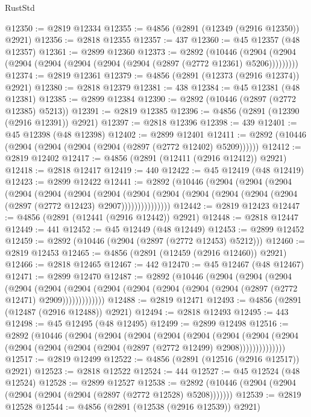 \begin{lexlean}{RustStd}
\begin{coremodule}
@12350 := @2819 @12334
@12355 := @4856 (@2891 (@12349 (@2916 @12350)) @2921)
@12356 := @2818 @12355
@12357 := 437
@12360 := @45 @12357 (@48 @12357)
@12361 := @2899 @12360
@12373 := @2892
    (@10446 (@2904 (@2904 (@2904 (@2904 (@2904 (@2904 (@2904 (@2897 (@2772 @12361) @5206)))))))))
@12374 := @2819 @12361
@12379 := @4856 (@2891 (@12373 (@2916 @12374)) @2921)
@12380 := @2818 @12379
@12381 := 438
@12384 := @45 @12381 (@48 @12381)
@12385 := @2899 @12384
@12390 := @2892 (@10446 (@2897 (@2772 @12385) @5213))
@12391 := @2819 @12385
@12396 := @4856 (@2891 (@12390 (@2916 @12391)) @2921)
@12397 := @2818 @12396
@12398 := 439
@12401 := @45 @12398 (@48 @12398)
@12402 := @2899 @12401
@12411 := @2892 (@10446 (@2904 (@2904 (@2904 (@2904 (@2897 (@2772 @12402) @5209))))))
@12412 := @2819 @12402
@12417 := @4856 (@2891 (@12411 (@2916 @12412)) @2921)
@12418 := @2818 @12417
@12419 := 440
@12422 := @45 @12419 (@48 @12419)
@12423 := @2899 @12422
@12441 := @2892
    (@10446
      (@2904
        (@2904
          (@2904
            (@2904
              (@2904
                (@2904
                  (@2904
                    (@2904
                      (@2904 (@2904 (@2904 (@2904 (@2904 (@2897 (@2772 @12423) @2907)))))))))))))))
@12442 := @2819 @12423
@12447 := @4856 (@2891 (@12441 (@2916 @12442)) @2921)
@12448 := @2818 @12447
@12449 := 441
@12452 := @45 @12449 (@48 @12449)
@12453 := @2899 @12452
@12459 := @2892 (@10446 (@2904 (@2897 (@2772 @12453) @5212)))
@12460 := @2819 @12453
@12465 := @4856 (@2891 (@12459 (@2916 @12460)) @2921)
@12466 := @2818 @12465
@12467 := 442
@12470 := @45 @12467 (@48 @12467)
@12471 := @2899 @12470
@12487 := @2892
    (@10446
      (@2904
        (@2904
          (@2904
            (@2904
              (@2904
                (@2904 (@2904 (@2904 (@2904 (@2904 (@2904 (@2897 (@2772 @12471) @2909)))))))))))))
@12488 := @2819 @12471
@12493 := @4856 (@2891 (@12487 (@2916 @12488)) @2921)
@12494 := @2818 @12493
@12495 := 443
@12498 := @45 @12495 (@48 @12495)
@12499 := @2899 @12498
@12516 := @2892
    (@10446
      (@2904
        (@2904
          (@2904
            (@2904
              (@2904
                (@2904
                  (@2904
                    (@2904 (@2904 (@2904 (@2904 (@2904 (@2897 (@2772 @12499) @2908))))))))))))))
@12517 := @2819 @12499
@12522 := @4856 (@2891 (@12516 (@2916 @12517)) @2921)
@12523 := @2818 @12522
@12524 := 444
@12527 := @45 @12524 (@48 @12524)
@12528 := @2899 @12527
@12538 := @2892 (@10446 (@2904 (@2904 (@2904 (@2904 (@2904 (@2897 (@2772 @12528) @5208)))))))
@12539 := @2819 @12528
@12544 := @4856 (@2891 (@12538 (@2916 @12539)) @2921)

\end{coremodule}
\end{lexlean}
